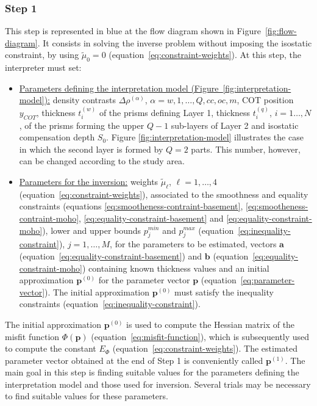 \documentclass[manuscript]{geophysics}
\begin{document}
\subsubsection{Step 1}

This step is represented in blue at the flow diagram shown in 
Figure~\ref{fig:flow-diagram}.
It consists in solving the inverse problem without imposing 
the isostatic constraint, by using $\tilde{\mu}_{0} = 0$ 
(equation~\ref{eq:constraint-weights}). 
At this step, the interpreter must set:
\begin{itemize}
	\item \underline{Parameters defining the interpretation model
	(Figure~\ref{fig:interpretation-model}):} density contrasts $\Delta \rho^{(\alpha)}$, 
	$\alpha = w, 1, \dots, Q, cc, oc, m$, COT position $y_{COT}$, thickness $t^{(w)}_{i}$ 
	of the prisms defining Layer 1, thickness $t^{(q)}_{i}$, $i = 1 \dots, N$, of the prisms
	forming the upper $Q-1$ sub-layers of Layer 2 and isostatic compensation depth $S_{0}$. 
	Figure \ref{fig:interpretation-model} illustrates 
	the case in which the second layer is formed by $Q = 2$ parts. This number, however, 
	can be changed according to the study area.
	\item \underline{Parameters for the inversion:} weights $\tilde{\mu}_{\ell}$,
	$\ell = 1, \dots, 4$ (equation~\ref{eq:constraint-weights}), associated to the 
	smoothness and equality constraints (equations 
	\ref{eq:smootheness-contraint-basement}, \ref{eq:smootheness-contraint-moho},
	\ref{eq:equality-constraint-basement} and \ref{eq:equality-constraint-moho}),
	lower and upper bounds $p_{j}^{min}$ and $p_{j}^{max}$
	(equation~\ref{eq:inequality-constraint}), $j = 1, \dots, M$,
	for the parameters to be estimated, vectors $\mathbf{a}$ 
	(equation~\ref{eq:equality-constraint-basement}) and $\mathbf{b}$
	(equation~\ref{eq:equality-constraint-moho}) containing known thickness values
	and an initial approximation $\mathbf{p}^{(0)}$ for the parameter vector $\mathbf{p}$
	(equation~\ref{eq:parameter-vector}). The initial approximation $\mathbf{p}^{(0)}$
	must satisfy the inequality constraints (equation~\ref{eq:inequality-constraint}).
\end{itemize}

The initial approximation $\mathbf{p}^{(0)}$ is used to compute the 
Hessian matrix of the misfit function $\Phi(\mathbf{p})$ (equation~\ref{eq:misfit-function}),
which is subsequently used to compute the constant $E_{\Phi}$ (equation~\ref{eq:constraint-weights}).
The estimated parameter vector obtained at the end of Step 1 is conveniently called
$\mathbf{p}^{(1)}$. The main goal in this step is finding suitable values for the parameters
defining the interpretation model and those used for inversion. Several trials may be
necessary to find suitable values for these parameters.
\end{document}
